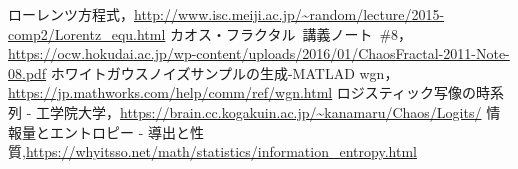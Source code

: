 \documentclass[autodetect-engine,dvipdfmx-if-dvi,ja=standard,a4paper,11pt]{bxjsarticle} %
\begin{document}









\begin{thebibliography}{9999}%
ローレンツ方程式，\url{http://www.isc.meiji.ac.jp/~random/lecture/2015-comp2/Lorentz_equ.html}
カオス・フラクタル\ 講義ノート\ \#8，\url{https://ocw.hokudai.ac.jp/wp-content/uploads/2016/01/ChaosFractal-2011-Note-08.pdf}
ホワイトガウスノイズサンプルの生成-MATLAD wgn，\url{https://jp.mathworks.com/help/comm/ref/wgn.html}
ロジスティック写像の時系列 - 工学院大学，\url{https://brain.cc.kogakuin.ac.jp/~kanamaru/Chaos/Logits/}
情報量とエントロピー - 導出と性質,\url{https://whyitsso.net/math/statistics/information_entropy.html}
\end{thebibliography}

\end{document}

